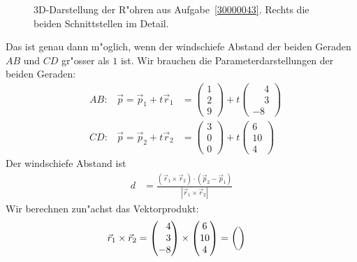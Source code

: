 \begin{loesung}
\begin{figure}
\caption{3D-Darstellung der R"ohren aus Aufgabe~\ref{30000043}.
Rechts die beiden Schnittstellen im Detail.
\label{30000043:tubes}}
\end{figure}
\begin{teilaufgaben}
\item
Das ist genau dann m"oglich, wenn der windschiefe Abstand der beiden
Geraden $AB$ und $CD$ gr"osser als $1$ ist.
Wir brauchen die Parameterdarstellungen der beiden Geraden:
\[
\begin{aligned}
&AB:&\vec{p}=\vec{p}_1+t\vec{r}_1
&=
\begin{pmatrix}1\\2\\9\end{pmatrix} + t\begin{pmatrix}\phantom{-}4\\\phantom{-}3\\-8\end{pmatrix}
\\
&CD:&\vec{p}=\vec{p}_2+t\vec{r}_2
&=
\begin{pmatrix}3\\0\\0\end{pmatrix} + t\begin{pmatrix}6\\10\\4\end{pmatrix}
\end{aligned}
\]
Der windschiefe Abstand ist
\begin{align*}
d
&=
\frac{(\vec{r}_1\times\vec{r}_2)\cdot (\vec{p}_2 - \vec{p}_1)}{|\vec{r}_1\times \vec{r}_2|}
\end{align*}
Wir berechnen zun"achst das Vektorprodukt:
\begin{align*}
\vec{r}_1\times \vec{r}_2
&=
\begin{pmatrix}\phantom{-}4\\\phantom{-}3\\-8\end{pmatrix}
\times
\begin{pmatrix}6\\10\\4\end{pmatrix}
=
{\def\arraystretch{2.2}
\begin{pmatrix}
{\def\arraystretch{1.0}
}
\end{pmatrix}}
\end{align*}
\end{teilaufgaben}
\end{loesung}
